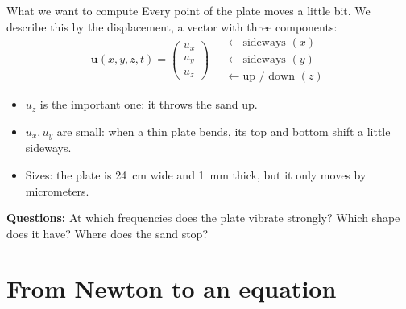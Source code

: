 \documentclass[aspectratio=169,11pt]{beamer}
\newcommand{\vect}[1]{\mathbf{#1}}
\newcommand{\uu}{\vect{u}}
\begin{document}
\begin{frame}{What we want to compute}
  Every point of the plate moves a little bit. We describe this by the
  \alert{displacement}, a vector with three components:
  \[
    \uu(x,y,z,t) =
    \begin{pmatrix} u_x \\ u_y \\ u_z \end{pmatrix}
    \quad
    \begin{array}{l}
      \leftarrow \text{sideways } (x) \\
      \leftarrow \text{sideways } (y) \\
      \leftarrow \text{up / down } (z)
    \end{array}
  \]
  \begin{itemize}
    \item $u_z$ is the important one: it throws the sand up.
    \item $u_x, u_y$ are small: when a thin plate bends, its top and bottom shift a little sideways.
    \item Sizes: the plate is \SI{24}{cm} wide and \SI{1}{mm} thick, but it only moves by
          \alert{micrometers}.
  \end{itemize}
  \medskip
  \textbf{Questions:} At which frequencies does the plate vibrate strongly?
  Which shape does it have? Where does the sand stop?
\end{frame}

\section{From Newton to an equation}
\end{document}

